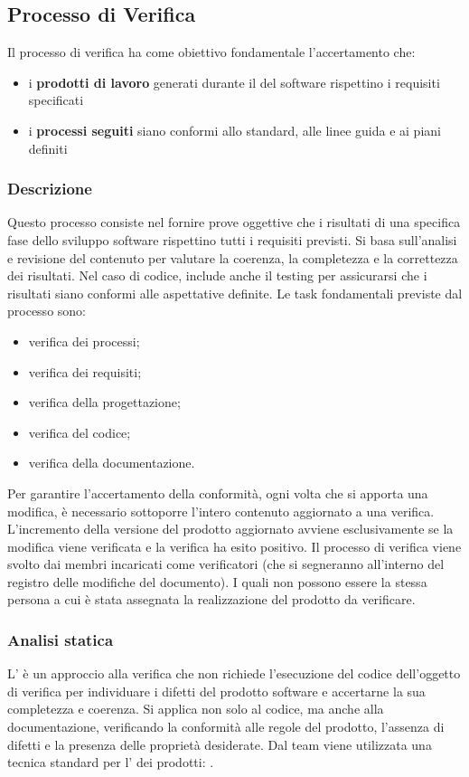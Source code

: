\subsection{Processo di Verifica}
\label{subsec:proc_verifica}
Il processo di verifica ha come obiettivo fondamentale l'accertamento che:
\begin{itemize}
    \item i \textbf{prodotti di lavoro} generati durante il  del software rispettino i requisiti specificati
    \item i \textbf{processi seguiti} siano conformi allo standard, alle linee guida e ai piani definiti
\end{itemize}

\subsubsection{Descrizione}
Questo processo consiste nel fornire prove oggettive che i risultati di una specifica fase dello sviluppo software rispettino tutti i requisiti previsti. 
Si basa sull’analisi e revisione del contenuto per valutare la coerenza, la completezza e la correttezza dei risultati. Nel caso di codice, include anche il testing per assicurarsi che i risultati siano conformi alle aspettative definite.
Le task fondamentali previste dal processo sono:
\begin{itemize}
    \item verifica dei processi;
    \item verifica dei requisiti;
    \item verifica della progettazione;
    \item verifica del codice;
    \item verifica della documentazione.
\end{itemize}
Per garantire l'accertamento della conformità, ogni volta che si apporta una modifica, è necessario sottoporre l'intero contenuto aggiornato a una verifica. 
L'incremento della versione del prodotto aggiornato avviene esclusivamente se la modifica viene verificata e la verifica ha esito positivo.
Il processo di verifica viene svolto dai membri incaricati come verificatori (che si segneranno all'interno del registro delle modifiche del documento). 
I quali non possono essere la stessa persona a cui è stata assegnata la realizzazione del prodotto da verificare.

\subsubsection{Analisi statica}
L' è un approccio alla verifica che non richiede l'esecuzione del codice dell'oggetto di verifica per individuare i difetti del prodotto software 
e accertarne la sua completezza e coerenza.
Si applica non solo al codice, ma anche alla documentazione, verificando la conformità alle regole del prodotto, l'assenza di difetti e la presenza delle proprietà desiderate.
Dal team viene utilizzata una tecnica standard per l' dei prodotti: \textbf{}.
